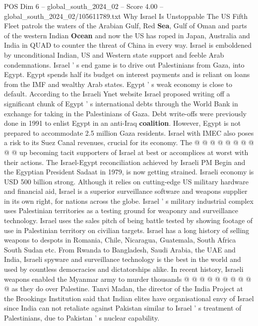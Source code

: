 \begin{textsample}{POS Dim 6 – global\_south\_2024\_02 – Score 4.00 – global\_south\_2024\_02/105611789.txt}  \label{ex:f6_pos_186}
Why Israel Is Unstoppable The US Fifth Fleet patrols the waters of the Arabian Gulf, Red \textbf{Sea}, Gulf of Oman and parts of the western Indian \textbf{Ocean} and now the US has roped in Japan, Australia and India in QUAD to counter the threat of China in every way.
Israel is emboldened by unconditional Indian, US and Western state support and feeble Arab condemnations.
Israel ' s end game is to drive out Palestinians from Gaza, into Egypt.
Egypt spends half its budget on interest payments and is reliant on loans from the IMF and wealthy Arab states.
Egypt ' s weak economy is close to default.
According to the Israeli Ynet website Israel proposed writing off a significant chunk of Egypt ' s international debts through the World Bank in exchange for taking in the Palestinians of Gaza.
Debt write-offs were previously done in 1991 to enlist Egypt in an anti-Iraq \textbf{coalition}.
However, Egypt is not prepared to accommodate 2.5 million Gaza residents.
Israel with IMEC also poses a risk to its Suez Canal revenues, crucial for its economy.
The @ @ @ @ @ @ @ @ @ @ up becoming tacit supporters of Israel at best or accomplices at worst with their actions.
The Israel-Egypt reconciliation achieved by Israeli PM Begin and the Egyptian President Sadaat in 1979, is now getting strained.
Israeli economy is USD 500 billion strong.
Although it relies on cutting-edge US military hardware and financial aid, Israel is a superior surveillance software and weapons supplier in its own right, for nations across the globe.
Israel ' s military industrial complex uses Palestinian territories as a testing ground for weaponry and surveillance technology.
Israel uses the sales pitch of being battle tested by showing footage of use in Palestinian territory on civilian targets.
Israel has a long history of selling weapons to despots in Romania, Chile, Nicaragua, Guatemala, South Africa South Sudan etc.
From Rwanda to Bangladesh, Saudi Arabia, the UAE and India, Israeli spyware and surveillance technology is the best in the world and used by countless democracies and dictatorships alike.
In recent history, Israeli weapons enabled the Myanmar army to murder thousands @ @ @ @ @ @ @ @ @ @ as they do over Palestine.
Tanvi Madan, the director of the India Project at the Brookings Institution said that Indian elites have organisational envy of Israel since India can not retaliate against Pakistan similar to Israel ' s treatment of Palestinians, due to Pakistan ' s nuclear capability.

\end{textsample}
